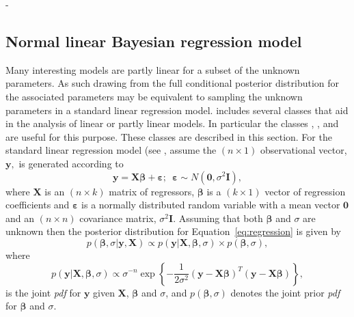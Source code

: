 -\documentclass[article]{jss}
\begin{document}
\subsection{Normal linear Bayesian regression model}
\label{sec: Regression Model}

Many interesting models are partly linear for a subset of the unknown
parameters. As such drawing from the full conditional posterior
distribution for the associated parameters may be equivalent to
sampling the unknown parameters in a standard linear regression model.
 includes several classes that aid in the analysis of
linear or partly linear models. In particular the classes
, ,
 and  are useful for
this purpose. These classes are described in this section.  For the
standard linear regression model (see \citet{Zellner1971}, assume the
$\left(n\times1\right)$ observational vector, $\bm{y},$ is generated
according to\begin{equation}
  \bm{y}=\bm{X}\bm{\beta}+\bm{\varepsilon};\,\,\,\bm{\varepsilon}\sim
  N(\bm{0},\sigma^{2}\bm{I}),\label{eq:regression}
\end{equation} where
$\bm{X}$ is an $(n\times k)$ matrix of regressors, $\bm{\beta}$ is a
$\left(k\times1\right)$ vector of regression coefficients and
$\bm{\varepsilon}$ is a normally distributed random variable with a
mean vector $\bm{0}$ and an $\left(n\times n\right)$ covariance
matrix, $\sigma^{2}\bm{I}.$ Assuming that both $\bm{\beta}$ and
$\sigma$ are unknown then the posterior distribution for Equation~\ref{eq:regression} is given by\begin{equation}
  p(\bm{\beta},\sigma|\bm{y},\bm{X})\propto
  p(\bm{y}|\bm{X},\bm{\beta},\sigma)\times
  p(\bm{\beta},\sigma),\label{eq:post regression}
\end{equation} where
\begin{equation}
  p(\bm{y}|\bm{X},\bm{\beta},\sigma)\propto\sigma^{-n}\exp\left\{
    -\frac{1}{2\sigma^{2}}\left(\bm{y}-\bm{X}\bm{\beta}\right)^{T}\left(\bm{y}-\bm{X}\bm{\beta}\right)\right\}
  ,\label{eq:likelihood regression}
\end{equation} is the joint
\emph{pdf} for $\bm{y}$ given $\bm{X}$, $\bm{\beta}$ and
$\sigma$, and\emph{ $p(\bm{\beta},\sigma)$ } denotes the joint
prior \emph{pdf} for $\bm{\beta}$ and $\sigma$.
\end{document}
